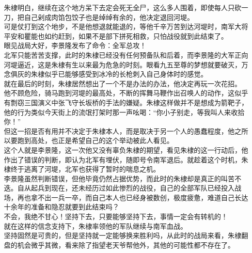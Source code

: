 \begin{multicols}{\theparacolNo}
朱棣明白，继续在这个地方呆下去定会死无全尸，这么多人围着，即使每人只砍一刀，把自己剁成肉馅包饺子也是绰绰有余的，他决定退回河堤。\\

可是仗打到这个地步，不是他想退就能退的，等他千辛万苦到达河堤时，南军大将平安和瞿能也如约赶到，如果不是部下拼死相救，只怕战役就到此结束了。\\

眼见战局大好，李景隆发布了命令：全军总攻！\\

北军只能苦苦支撑，此时的朱棣已经没有任何预备队和后着，而李景隆的大军正向河堤逼近，这是朱棣有生以来最为危急的时刻。眼看九五至尊的梦想就要破灭，万念俱灰的朱棣似乎已能够感受到冰冷的长枪刺入自己身体时的感觉。\\

就在最后的时刻，朱棣居然想出了一个不是办法的办法，他决定再玩一次花招。\\

他不顾危险，骑马跑到河堤的最高处，不断的挥舞马鞭作出召唤人的动作，这似乎有剽窃三国演义中张飞守长坂桥的手法的嫌疑。朱棣这样做并不是想成为箭靶子，他的行为类似今天街上的流氓打架时那一声吆喝：“你小子别走，等我叫人来收拾你！”\\

但这一招是否有用并不决定于朱棣本人，而是取决于另一个人的愚蠢程度，他之所以要跑到高处，也正是希望自己的这个举动被此人看见。\\

这个人就是李景隆，这一次他又没有辜负朱棣的期望，看见朱棣的这一行动后，他作出了错误的判断，即认为北军有埋伏，随即号令南军退后。就趁着这个时机，朱棣终于逃离了河堤，北军也获得了暂时的喘息之机。\\

李景隆虽然判断错误，但他毕竟仍然占据优势，而此时的朱棣却是真正的叫苦不迭。自从起兵到现在，还未经历过如此惨烈的战役，自己的全部军队已经投入战场，再也拿不出一兵一卒，而自己本人也已经身被数创，极度疲惫，难道自己长达十余年的准备和隐忍就要到此结束吗？\\

不会，我绝不甘心！坚持下去，只要能够坚持下去，事情一定会有转机的！\\

就在这样的信念支持下，朱棣率领他的军队继续与南军血战。\\

坚持固然是可贵的，但是坚持就一定能够换来胜利吗，从此时的战局来看，朱棣翻盘的机会微乎其微，看来除了指望老天爷帮他外，其他的可能性都不存在了。\\


\end{multicols}
